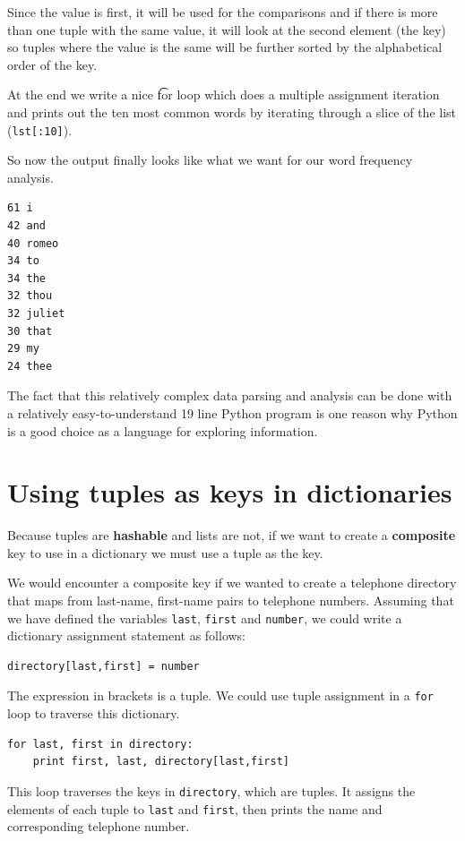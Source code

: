 \documentclass[10pt]{book}
\begin{document}
Since the value is first, it will be used for the comparisons and 
if there is more than one tuple with the same value, it will look
at the second element (the key) so tuples where the value is the
same will be further sorted by the alphabetical order of the key.

At the end we write a nice {\t for loop} which does a multiple
assignment iteration and prints out the ten most common words
by iterating through a slice of the list ({\tt lst[:10]}).

So now the output finally looks like what we want for our word 
frequency analysis.

\beforeverb
\begin{verbatim}
61 i
42 and
40 romeo
34 to
34 the
32 thou
32 juliet
30 that
29 my
24 thee
\end{verbatim}
\afterverb
%
The fact that this relatively complex data parsing and analysis 
can be done with a relatively easy-to-understand 19 line Python
program is one reason why Python is a good choice as a language 
for exploring information.

\section{Using tuples as keys in dictionaries}


Because tuples are {\bf hashable} and lists are not, if we want to 
create a {\bf composite} key to use in a dictionary we must use a tuple as
the key.

We would encounter a composite key if we wanted to create a 
telephone directory that maps
from last-name, first-name pairs to telephone numbers.  Assuming
that we have defined the variables 
{\tt last}, {\tt first} and {\tt number}, we could write
a dictionary assignment statement as follows:

\beforeverb
\begin{verbatim}
directory[last,first] = number
\end{verbatim}
\afterverb
%
The expression in brackets is a tuple.  We could use tuple
assignment in a {\tt for} loop to traverse this dictionary.


\beforeverb
\begin{verbatim}
for last, first in directory:
    print first, last, directory[last,first]
\end{verbatim}
\afterverb
%
This loop traverses the keys in {\tt directory}, which are tuples.  It
assigns the elements of each tuple to {\tt last} and {\tt first}, then
prints the name and corresponding telephone number.
\end{document}
